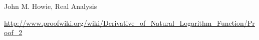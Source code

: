 \documentclass[12pt]{article}
\theoremstyle{mystyle}
\begin{document}

\begin{thebibliography}{10}

John M. Howie, Real Analysis

\url{http://www.proofwiki.org/wiki/Derivative_of_Natural_Logarithm_Function/Proof_2}

\end{thebibliography}
\end{document}
